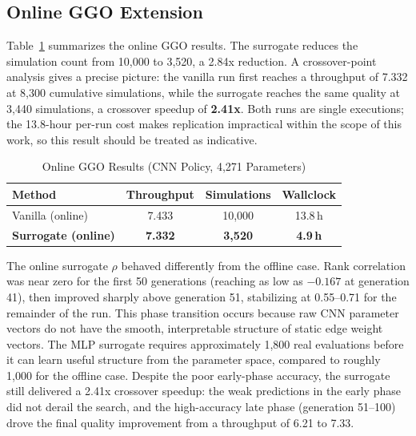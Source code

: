 \documentclass[conference]{IEEEtran}
\begin{document}
\subsection{Online GGO Extension}
\label{sec:online}

Table~\ref{tab:online} summarizes the online GGO results. The surrogate
reduces the simulation count from 10,000 to 3,520, a 2.84x reduction.
A crossover-point analysis gives a precise picture: the vanilla run first
reaches a throughput of 7.332 at 8,300 cumulative simulations, while the
surrogate reaches the same quality at 3,440 simulations, a crossover
speedup of \textbf{2.41x}. Both runs are single executions; the 13.8-hour
per-run cost makes replication impractical within the scope of this work,
so this result should be treated as indicative.

\begin{table}[htbp]
  \caption{Online GGO Results (CNN Policy, 4,271 Parameters)}
  \label{tab:online}
  \begin{center}
    \begin{tabular}{lccc}
      \toprule
      \textbf{Method} & \textbf{Throughput} & \textbf{Simulations} & \textbf{Wallclock} \\
      \midrule
      Vanilla (online)            & 7.433 & 10,000 & 13.8\,h \\
      \textbf{Surrogate (online)} & \textbf{7.332} & \phantom{0}\textbf{3,520} & \textbf{4.9\,h} \\
      \bottomrule
    \end{tabular}
  \end{center}
\end{table}

The online surrogate $\rho$ behaved differently from the offline case.
Rank correlation was near zero for the first 50 generations (reaching as
low as $-0.167$ at generation 41), then improved sharply above generation
51, stabilizing at 0.55--0.71 for the remainder of the run. This phase
transition occurs because raw CNN parameter vectors do not have the smooth,
interpretable structure of static edge weight vectors. The MLP surrogate
requires approximately 1,800 real evaluations before it can learn useful
structure from the parameter space, compared to roughly 1,000 for the
offline case. Despite the poor early-phase accuracy, the surrogate still
delivered a 2.41x crossover speedup: the weak predictions in the early
phase did not derail the search, and the high-accuracy late phase
(generation 51--100) drove the final quality improvement from a throughput
of 6.21 to 7.33.
\end{document}
